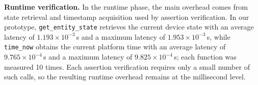\textbf{Runtime verification.} In the runtime phase, the main overhead comes from state retrieval and timestamp acquisition used by assertion verification. In our prototype, \texttt{get\_entity\_state} retrieves the current device state with an average latency of $1.193 \times 10^{-3}$\,s and a maximum latency of $1.953 \times 10^{-3}$\,s, while \texttt{time\_now} obtains the current platform time with an average latency of $9.765 \times 10^{-4}$\,s and a maximum latency of $9.825 \times 10^{-4}$\,s; each function was measured 10 times. Each assertion verification requires only a small number of such calls, so the resulting runtime overhead remains at the millisecond level.